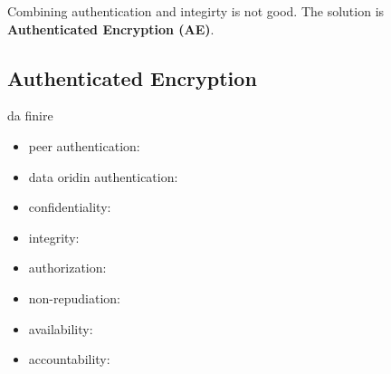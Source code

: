 \documentclass[12pt]{article}
\begin{document}
Combining authentication and integirty is not good. The solution is \textbf{Authenticated Encryption (AE)}.

\subsection{Authenticated Encryption}
da finire




\begin{itemize}
    \item peer authentication: 
    \item data oridin authentication: 
    \item confidentiality:
    \item integrity:
    \item authorization:
    \item non-repudiation:
    \item availability:
    \item accountability:
\end{itemize}
\end{document}
